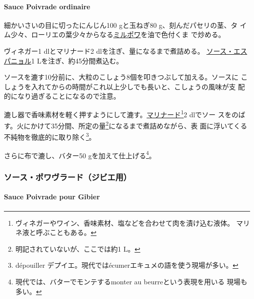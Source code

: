 \begin{recette}
\hypertarget{sauce-poivrade}{%
\paragraph{Sauce Poivrade ordinaire}\label{sauce-poivrade}}

   

細かいさいの目に切ったにんじん100 gと玉ねぎ80 g、刻んだパセリの茎、タ
イム少々、ローリエの葉少々からなる\protect\hyperlink{mirepoix}{ミルポワ}を油で色付くま
で炒める。

ヴィネガー1 dlとマリナード2 dlを注ぎ、\untiers{}量になるまで煮詰める。
\protect\hyperlink{sauce-espagnole}{ソース・エスパニョル}1
Lを注ぎ、約45分間煮込む。

ソースを漉す10分前に、大粒のこしょう8個を叩きつぶして加える。ソースに
こしょうを入れてからの時間がこれ以上少しでも長いと、こしょうの風味が支
配的になり過ぎることになるので注意。

漉し器で香味素材を軽く押すようにして漉す。\protect\hyperlink{}{マリナード}\footnote{ヴィネガーやワイン、香味素材、塩などを合わせて肉を漬け込む液体。
  マリネ液と呼ぶこともある。}2 dlでソー
スをのばす。火にかけて35分間、所定の量\footnote{明記されていないが、ここでは約1
  L。}になるまで煮詰めながら、表
面に浮いてくる不純物を徹底的に取り除く\footnote{dépouiller
  デプイエ。現代ではécumerエキュメの語を使う現場が多い。}。

さらに布で漉し、バター50 gを加えて仕上げる\footnote{現代では、バターでモンテするmonter
  au beurreという表現を用いる 現場も多い。}。

\maeaki

\hypertarget{ux30bdux30fcux30b9ux30ddux30efux30f4ux30e9ux30fcux30c9ux30b8ux30d3ux30a8ux7528}{%
\subsubsection{ソース・ポワヴラード（ジビエ用）}\label{ux30bdux30fcux30b9ux30ddux30efux30f4ux30e9ux30fcux30c9ux30b8ux30d3ux30a8ux7528}}

\hypertarget{sauce-poivrade-pour-gibier}{%
\paragraph{Sauce Poivrade pour
Gibier}\label{sauce-poivrade-pour-gibier}}


\end{recette}
